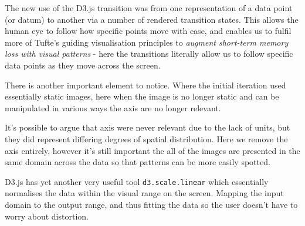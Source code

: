 \documentclass[a4paper,11pt,titlepage]{article}
\begin{document}
	The new use of the D3.js transition was from one representation of a data point (or datum) to another via a number of rendered transition states. This allows the human eye to follow how specific points move with ease, and enables us to fulfil more of Tufte's guiding visualisation principles to \textit{augment short-term memory loss with visual patterns} - here the transitions literally allow us to follow specific data points as they move across the screen.
	\par 
	
		\begin{figure}[H]
    			\centering	
    			\qquad
    			\caption{}%
    			\label{fig:epoch_layer}
	\end{figure}
	
	There is another important element to notice. Where   the initial iteration used essentially static images, here when the image is no longer static and can be manipulated in various ways the axis are no longer relevant.
	\par 
	It's possible to argue that axis were never relevant due to the lack of units, but they did represent differing degrees of spatial distribution. Here we remove the axis entirely, however it's still important the all of the images are presented in the same domain across the data so that patterns can be more easily spotted. 
	\par 
	D3.js has yet another very useful tool \texttt{d3.scale.linear} which essentially normalises the data within the visual range on the screen. Mapping the input domain to the output range, and thus fitting the data so the user doesn't have to worry about distortion.
	
\end{document}
